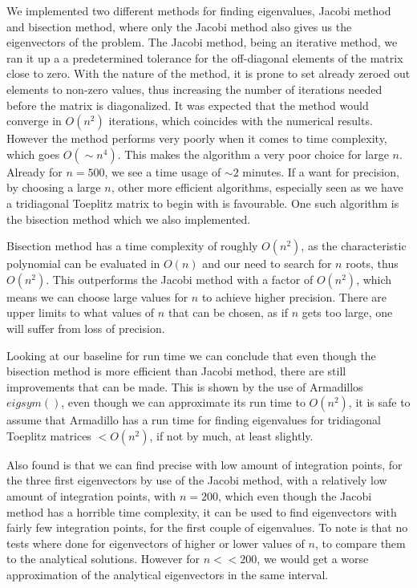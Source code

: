 \documentclass[%
reprint,
nofootinbib,
amsmath,amssymb,
aps,
]{revtex4-1}
\begin{document}
We implemented two different methods for finding eigenvalues, Jacobi method and bisection method, where only the Jacobi method also gives us the eigenvectors of the problem. The Jacobi method, being an iterative method, we ran it up a a predetermined tolerance for the off-diagonal elements of the matrix close to zero. With the nature of the method, it is prone to set already zeroed out elements to non-zero values, thus increasing the number of iterations needed before the matrix is diagonalized. It was expected that the method would converge in $O(n^2)$ iterations, which coincides with the numerical results. However the method performs very poorly when it comes to time complexity, which goes $O(\sim n^4)$. This makes the algorithm a very poor choice for large $n$. Already for $n= 500$, we see a time usage of $\sim 2$ minutes. If a want for precision, by choosing a large $n$, other more efficient algorithms, especially seen as we have a tridiagonal Toeplitz matrix to begin with is favourable. 
One such algorithm is the bisection method which we also implemented. 

Bisection method has a time complexity of roughly $O(n^2)$, as the characteristic polynomial can be evaluated in $O(n)$ and our need to search for $n$ roots, thus $O(n^2)$. This outperforms the Jacobi method with a factor of $O(n^2)$, which means we can choose large values for $n$ to achieve higher precision. There are upper limits to what values of $n$ that can be chosen, as if $n$ gets too large, one will suffer from loss of precision. 

Looking at our baseline for run time we can conclude that even though the bisection method is more efficient than Jacobi method, there are still improvements that can be made. This is shown by the use of Armadillos $eigsym()$, even though we can approximate its run time to $O(n^2)$, it is safe to assume that Armadillo has a run time for finding eigenvalues for tridiagonal Toeplitz matrices $<O(n^2)$, if not by much, at least slightly. 

Also found is that we can find precise with low amount of integration points, for the three first eigenvectors by use of the Jacobi method, with a relatively low amount of integration points, with $n = 200$, which even though the Jacobi method has a horrible time complexity, it can be used to find eigenvectors with fairly few integration points, for the first couple of eigenvalues. To note is that no tests where done for eigenvectors of higher or lower values of $n$, to compare them to the analytical solutions. However for $n << 200$, we would get a worse approximation of the analytical eigenvectors in the same interval. 
\end{document}

